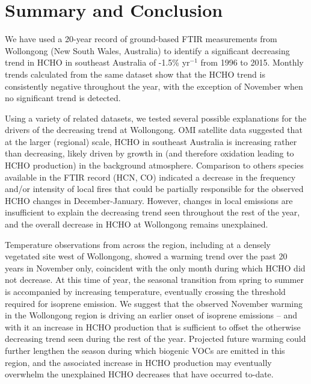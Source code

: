 \documentclass[draft,linenumbers]{AGUJournal}
\begin{document}
\section{Summary and Conclusion}

We have used a 20-year record of ground-based FTIR measurements from Wollongong (New South Wales, Australia) to identify a significant decreasing trend in HCHO in southeast Australia of -1.5\% yr$^{-1}$ from 1996 to 2015. Monthly trends calculated from the same dataset show that the HCHO trend is consistently negative throughout the year, with the exception of November when no significant trend is detected.

Using a variety of related datasets, we tested several possible explanations for the drivers of the decreasing trend at Wollongong. OMI satellite data suggested that at the larger (regional) scale, HCHO in southeast Australia is increasing rather than decreasing, likely driven by growth in  (and therefore  oxidation leading to HCHO production) in the background atmosphere. Comparison to others species available in the FTIR record (HCN, CO) indicated a decrease in the frequency and/or intensity of local fires that could be partially responsible for the observed HCHO changes in December-January. However, changes in local emissions are insufficient to explain the decreasing trend seen throughout the rest of the year, and the overall decrease in HCHO at Wollongong remains unexplained.

Temperature observations from across the region, including at a densely vegetated site west of Wollongong, showed a warming trend over the past 20 years in November only, coincident with the only month during which HCHO did not decrease. At this time of year, the seasonal transition from spring to summer is accompanied by increasing temperature, eventually crossing the threshold required for isoprene emission. We suggest that the observed November warming in the Wollongong region is driving an earlier onset of isoprene emissions -- and with it an increase in HCHO production that is sufficient to offset the otherwise decreasing trend seen during the rest of the year. Projected future warming \citep{Hughes2003,Alexander2009} could further lengthen the season during which biogenic VOCs are emitted in this region, and the associated increase in HCHO production may eventually overwhelm the unexplained HCHO decreases that have occurred to-date.



\end{document}

